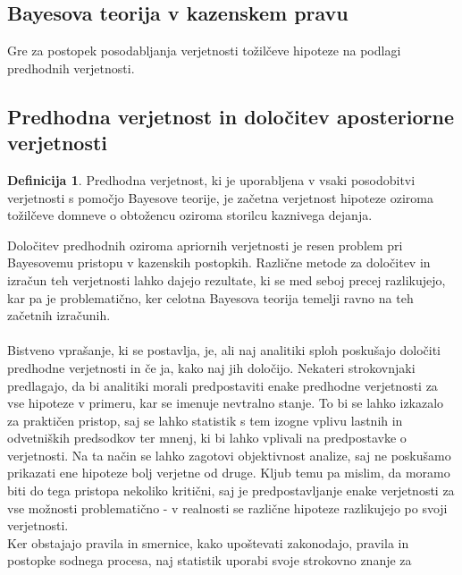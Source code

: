 \documentclass[12pt,a4paper]{amsart}
\theoremstyle{definition} %
\newtheorem{definicija}{Definicija}[section]
\theoremstyle{plain} %
\begin{document}
\subsection{Bayesova teorija v kazenskem pravu}
Gre za postopek posodabljanja verjetnosti tožilčeve hipoteze na podlagi predhodnih verjetnosti.\\

\subsection{Predhodna verjetnost in določitev aposteriorne verjetnosti}
\begin{definicija}
    Predhodna verjetnost, ki je uporabljena v vsaki posodobitvi verjetnosti s pomočjo Bayesove teorije, je začetna verjetnost hipoteze 
    oziroma tožilčeve domneve o obtožencu oziroma storilcu kaznivega dejanja.
\end{definicija}
Določitev predhodnih oziroma apriornih verjetnosti je resen problem pri Bayesovemu pristopu v kazenskih postopkih. Različne metode za določitev 
in izračun teh verjetnosti lahko dajejo rezultate, ki se med seboj precej razlikujejo, kar pa je problematično, ker celotna Bayesova teorija 
temelji ravno na teh začetnih izračunih.\\\\
Bistveno vprašanje, ki se postavlja, je, ali naj analitiki sploh poskušajo določiti predhodne verjetnosti in če ja, kako naj jih določijo. Nekateri 
strokovnjaki predlagajo, da bi analitiki morali predpostaviti enake predhodne verjetnosti za vse hipoteze v primeru, kar se imenuje nevtralno stanje. 
To bi se lahko izkazalo za praktičen pristop, saj se lahko statistik s tem izogne vplivu lastnih in odvetniških predsodkov ter mnenj, ki bi lahko 
vplivali na predpostavke o verjetnosti. Na ta način se lahko zagotovi objektivnost analize, saj ne poskušamo prikazati ene hipoteze bolj verjetne 
od druge. Kljub temu pa mislim, da moramo biti do tega pristopa nekoliko kritični, saj je predpostavljanje enake verjetnosti za vse možnosti 
problematično - v realnosti se različne hipoteze razlikujejo po svoji verjetnosti.\\
Ker obstajajo pravila in smernice, kako upoštevati zakonodajo, pravila in postopke sodnega procesa, naj statistik uporabi svoje strokovno znanje za 
\end{document}
